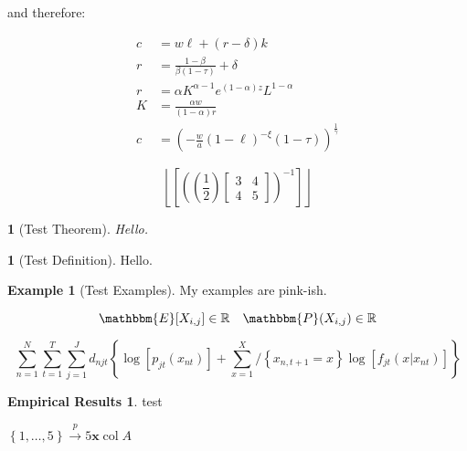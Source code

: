 \documentclass[11pt]{article}
\numberwithin{equation}{section}
\theoremstyle{plain}
\newtheorem{theorem}{\color{ForestGreen}{\textbf{Theorem}}}[section]
\theoremstyle{definition}
\newtheorem{definition}{\color{MidnightBlue}{\textbf{Definition}}}[section]
\newtheorem{example}{\color{WildStrawberry}Example}[section]
\newtheorem*{eresults}{Empirical Results}
\newcommand\parens[1]{\left( #1 \right)}
\newcommand\squares[1]{\left[ #1 \right]}
\newcommand\braces[1]{\left\{ #1 \right\}}
\newcommand\floor[1]{\left\lfloor #1 \right\rfloor}
\newcommand\vect[1]{\mathbf{#1}}
\newcommand\inv[1]{#1^{-1}}
\def\Set{\set*}%
\newcommand\intsfin[1]{\braces{1, \ldots, #1}}
\newcommand{\toprob}{\stackrel { p } {\to} }
\newcommand{\1}{\mathbbm 1}
\def\a{\alpha}
\def\b{\beta}
\def\g{\gamma}
\def\d{\delta}
\def\t{\tau}
\def\vx{\vect{x}}
\newcommand{\RR}{\mathbb R}
\newcommand{\ee}[1]{\mathbbm{E}[{#1}]}
\newcommand{\pp}[1]{\mathbbm{P}({#1})}
\def\cA{\col{A}}
\DeclareMathOperator{\col}{col}
\begin{document}
and therefore:

\begin{align}
c&=w \ell+ (r-\delta) k \\
r&= \frac{1-\b}{\b (1 - \t)} + \d \\
r&=\a K^{\alpha - 1} e^{(1-\alpha)z}L^{1-\a}\\
K &= \frac{\a w}{(1-\a)r}\\
c &= \parens{-\frac{w}{a}(1-\ell)^{-\xi}(1-\tau)}^{\frac{1}{\g}}
\end{align}









\newpage


\begin{equation}
	\floor{\squares{\inv{\parens{\parens{\frac{1}{2}} \begin{bmatrix} 3 & 4 \\ 4 & 5\end{bmatrix} }}}}
\end{equation}


\begin{theorem}[Test Theorem]
	Hello.
\end{theorem}

\begin{definition}[Test Definition]
	Hello.
\end{definition}

\begin{example}[Test Examples]
	My examples are pink-ish.
\end{example}

\begin{equation}
	\ee{X_{i,j}} \in \RR \quad \pp{X_{i,j}} \in \RR
\end{equation}



\begin{equation}
\sum_{n=1}^{N} \sum_{t=1}^{T} \sum_{j=1}^{J} d_{n j t}\left\{\log \left[p_{j t}\left(x_{n t}\right)\right]+\sum_{x=1}^{X} /\left\{x_{n, t+1}=x\right\} \log \left[f_{j t}\left(x | x_{n t}\right)\right]\right\}
\end{equation}

\begin{eresults}
test
\end{eresults}

$\intsfin{5} \toprob{5} \vx \cA$


\newpage 
\listoftodos
\end{document}
